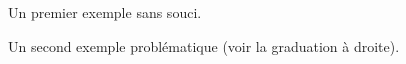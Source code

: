\documentclass[varwidth, border = 3pt]{standalone}
\begin{document}
Un premier exemple sans souci.


Un second exemple problématique (voir la graduation à droite).

\end{document}
